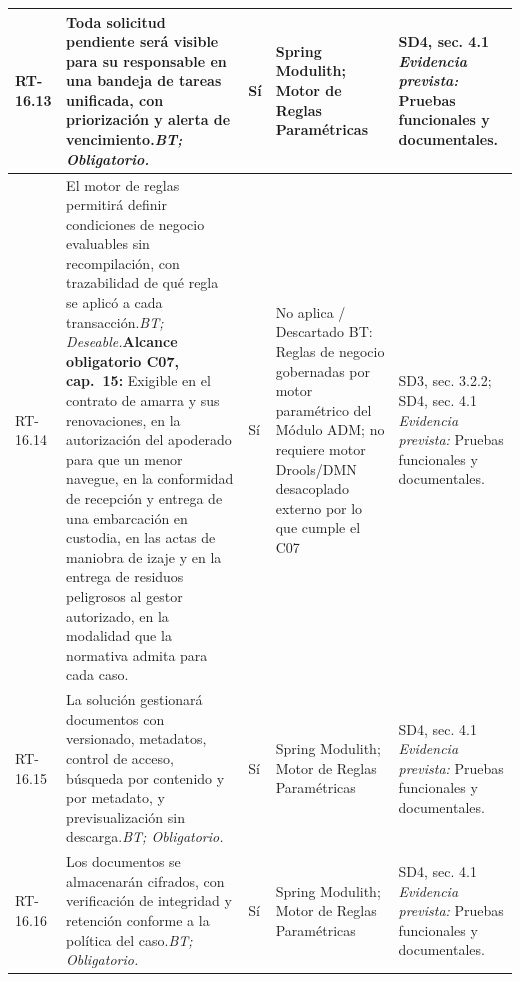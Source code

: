 \begin{paginaHorizontalSynaptix}
\begin{longtable}{|L{0.09\AnchoMatrizTDoce}|L{0.385\AnchoMatrizTDoce}|L{0.065\AnchoMatrizTDoce}|L{0.18\AnchoMatrizTDoce}|L{0.28\AnchoMatrizTDoce}|}
RT-\allowbreak{}16.\allowbreak{}13 &
Toda solicitud pendiente será visible para su responsable en una bandeja de tareas unificada, con priorización y alerta de vencimiento.\newline\textit{BT; Obligatorio.} &
Sí &
Spring Modulith; Motor de Reglas Paramétricas &
SD4, sec. 4.1 \newline\textit{Evidencia prevista:} Pruebas funcionales y documentales. \\ \hline

RT-\allowbreak{}16.\allowbreak{}14 &
El motor de reglas permitirá definir condiciones de negocio evaluables sin recompilación, con trazabilidad de qué regla se aplicó a cada transacción.\newline\textit{BT; Deseable.}\newline\textbf{Alcance obligatorio C07, cap.~15:} Exigible en el contrato de amarra y sus renovaciones, en la autorización del apoderado para que un menor navegue, en la conformidad de recepción y entrega de una embarcación en custodia, en las actas de maniobra de izaje y en la entrega de residuos peligrosos al gestor autorizado, en la modalidad que la normativa admita para cada caso. &
Sí &
No aplica / Descartado BT: Reglas de negocio gobernadas por motor paramétrico del Módulo ADM; no requiere motor Drools/DMN desacoplado externo por lo que cumple el C07 &
SD3, sec. 3.2.2; SD4, sec. 4.1 \newline\textit{Evidencia prevista:} Pruebas funcionales y documentales. \\ \hline

RT-\allowbreak{}16.\allowbreak{}15 &
La solución gestionará documentos con versionado, metadatos, control de acceso, búsqueda por contenido y por metadato, y previsualización sin descarga.\newline\textit{BT; Obligatorio.} &
Sí &
Spring Modulith; Motor de Reglas Paramétricas &
SD4, sec. 4.1 \newline\textit{Evidencia prevista:} Pruebas funcionales y documentales. \\ \hline

RT-\allowbreak{}16.\allowbreak{}16 &
Los documentos se almacenarán cifrados, con verificación de integridad y retención conforme a la política del caso.\newline\textit{BT; Obligatorio.} &
Sí &
Spring Modulith; Motor de Reglas Paramétricas &
SD4, sec. 4.1 \newline\textit{Evidencia prevista:} Pruebas funcionales y documentales. \\ \hline


\end{longtable}
\end{paginaHorizontalSynaptix}
